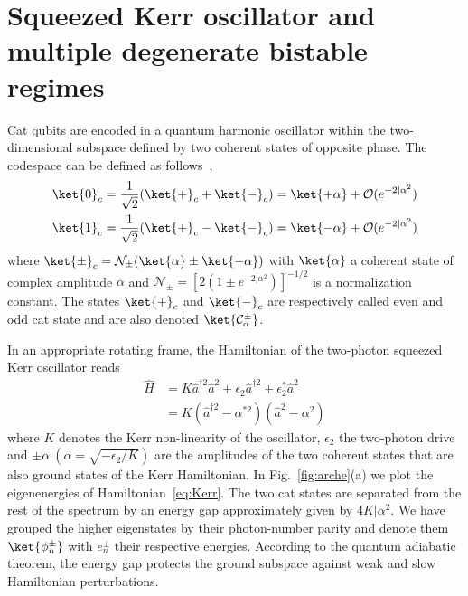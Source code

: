 \section{\label{sec:level2}Squeezed Kerr oscillator and multiple degenerate bistable regimes}

Cat qubits are encoded in a quantum harmonic oscillator within the two-dimensional subspace defined by two coherent states of opposite phase. The codespace can be defined as follows~\cite{Cochrane1999,Mirrahimi2014},
\begin{equation}
\begin{split}
    \ket{0}_c=\frac{1}{\sqrt{2}}(\ket{+}_c+\ket{-}_c) = \ket{+\alpha}+\mathcal{O} (e^{-2|{\alpha}^2}) \\
        \ket{1}_c=\frac{1}{\sqrt{2}}(\ket{+}_c-\ket{-}_c) = \ket{-\alpha}+\mathcal{O}(e^{-2|{\alpha}^2})
        \label{eq:CatEncoding}
\end{split}
\end{equation}
where $\ket{\pm}_c=\mathcal{N}_{\pm}(\ket{\alpha}\pm\ket{-\alpha})$ with $\ket{\alpha}$ a coherent state of complex amplitude $\alpha$ and $\mathcal{N}_{\pm}=[2 (1\pm e^{-2 |{\alpha}^2})]^{-1/2}$ is a normalization constant. The states $\ket{+}_c$ and $\ket{-}_c$ are respectively called even and odd cat state and are also denoted $\ket{\mathcal{C_\alpha^\pm}}$.

In an appropriate rotating frame, the Hamiltonian of the two-photon squeezed Kerr oscillator reads~\cite{Puri2017}
\begin{equation}\label{eq:Kerr}
    \begin{split}
        \hat{H} &= K\hat{a}^{\dagger 2}\hat{a}^{ 2} + \epsilon_2 \hat{a}^{\dagger 2} + \epsilon_2^* \hat{a}^{2} \\
        &= K(\hat{a}^{\dagger 2} - \alpha^{*2})(\hat{a}^{ 2} - \alpha^2)
    \end{split}
\end{equation}
where $K$ denotes the Kerr non-linearity of the oscillator, $\epsilon_2$ the two-photon drive and $\pm \alpha\ (\alpha = \sqrt{-\epsilon_2/K})$ are the amplitudes of the two coherent states that are also ground states of the Kerr Hamiltonian. In Fig.~\ref{fig:arche}(a) we plot the eigenenergies of Hamiltonian~\eqref{eq:Kerr}. The two cat states are separated from the rest of the spectrum by an energy gap approximately given by $4 K |{\alpha}^2 $. We have grouped the higher eigenstates by their photon-number parity and denote them $\ket{\phi_n^\pm}$ with $e^\pm_n$ their respective energies. According to the quantum adiabatic theorem, the energy gap protects the ground subspace against weak and slow Hamiltonian perturbations.

